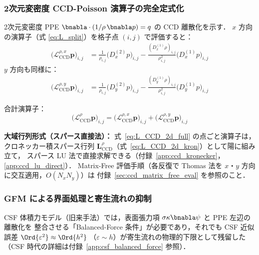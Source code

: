 \subsubsection{2次元変密度 CCD-Poisson 演算子の完全定式化}
\label{sec:ccd_2d_full}

2次元変密度 PPE $\bnabla\cdot(1/\rho\,\bnabla p) = q$ の CCD 離散化を示す．
$x$ 方向の演算子（式 \eqref{eq:L_split}）を格子点 $(i,j)$ で評価すると：
\begin{align}
  \bigl(\mathcal{L}_{\mathrm{CCD}}^{\rho,x}\bm{p}\bigr)_{i,j}
  &= \frac{1}{\rho_{i,j}}\bigl(D_x^{(2)} p\bigr)_{i,j}
  - \frac{(D_x^{(1)}\rho)_{i,j}}{\rho_{i,j}^2}\bigl(D_x^{(1)} p\bigr)_{i,j}
  \label{eq:Lx_varrho_discrete}
\end{align}
$y$ 方向も同様に：
\begin{align}
  \bigl(\mathcal{L}_{\mathrm{CCD}}^{\rho,y}\bm{p}\bigr)_{i,j}
  &= \frac{1}{\rho_{i,j}}\bigl(D_y^{(2)} p\bigr)_{i,j}
  - \frac{(D_y^{(1)}\rho)_{i,j}}{\rho_{i,j}^2}\bigl(D_y^{(1)} p\bigr)_{i,j}
  \label{eq:Ly_varrho_discrete}
\end{align}

合計演算子：
\begin{equation}
  \bigl(\mathcal{L}_{\mathrm{CCD}}^{\rho}\bm{p}\bigr)_{i,j}
  = \bigl(\mathcal{L}_{\mathrm{CCD}}^{\rho,x}\bm{p}\bigr)_{i,j}
  + \bigl(\mathcal{L}_{\mathrm{CCD}}^{\rho,y}\bm{p}\bigr)_{i,j}
  \label{eq:L_CCD_2d_full}
\end{equation}

\noindent\textbf{大域行列形式（スパース直接法）：}
式~\eqref{eq:L_CCD_2d_full} の点ごと演算子は，クロネッカー積スパース行列
$\mathbf{L}_{\mathrm{CCD}}^{\rho}$（式~\eqref{eq:L_CCD_2d_kron}）として陽に組み立て，
スパース LU 法で直接求解できる（付録~\ref{app:ccd_kronecker}，\ref{app:ccd_lu_direct}）．
Matrix-Free 評価手順（各反復で Thomas 法を $x$・$y$ 方向に交互適用，$O(N_x N_y)$）は
付録~\ref{sec:ccd_matrix_free_eval} を参照のこと．

\subsubsection{GFM による界面処理と寄生流れの抑制}
\label{sec:ccd_balanced_force}

CSF 体積力モデル（旧来手法）では，表面張力項 $\sigma\kappa\bnabla\psi$ と PPE 左辺の離散化を
整合させる「Balanced-Force 条件」が必要であり，それでも CSF 近似誤差 $\Ord{\varepsilon^2} \approx \Ord{h^2}$
（$\varepsilon \sim h$）が寄生流れの物理的下限として残留した（CSF 時代の詳細は付録~\ref{app:csf_balanced_force} 参照）．

